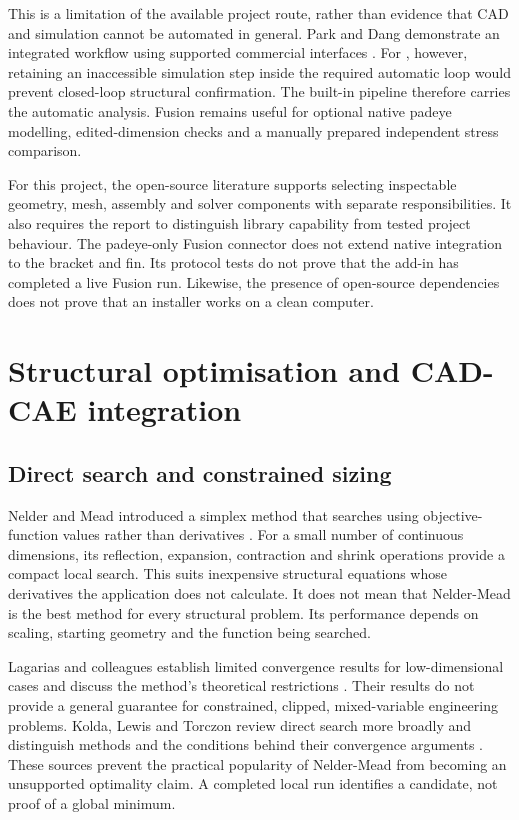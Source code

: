 This is a limitation of the available project route, rather than evidence that CAD and simulation cannot be automated in general. Park and Dang demonstrate an integrated workflow using supported commercial interfaces \cite{park2010}. For \NEMO{}, however, retaining an inaccessible simulation step inside the required automatic loop would prevent closed-loop structural confirmation. The built-in pipeline therefore carries the automatic analysis. Fusion remains useful for optional native padeye modelling, edited-dimension checks and a manually prepared independent stress comparison.

For this project, the open-source literature supports selecting inspectable geometry, mesh, assembly and solver components with separate responsibilities. It also requires the report to distinguish library capability from tested project behaviour. The padeye-only Fusion connector does not extend native integration to the bracket and fin. Its protocol tests do not prove that the add-in has completed a live Fusion run. Likewise, the presence of open-source dependencies does not prove that an installer works on a clean computer.

\section{Structural optimisation and CAD-CAE integration}
\label{sec:lit-optimisation}

\subsection{Direct search and constrained sizing}
\label{sec:lit-direct-search}

Nelder and Mead introduced a simplex method that searches using objective-function values rather than derivatives \cite{nelder1965}. For a small number of continuous dimensions, its reflection, expansion, contraction and shrink operations provide a compact local search. This suits inexpensive structural equations whose derivatives the application does not calculate. It does not mean that Nelder-Mead is the best method for every structural problem. Its performance depends on scaling, starting geometry and the function being searched.

Lagarias and colleagues establish limited convergence results for low-dimensional cases and discuss the method's theoretical restrictions \cite{lagarias1998}. Their results do not provide a general guarantee for constrained, clipped, mixed-variable engineering problems. Kolda, Lewis and Torczon review direct search more broadly and distinguish methods and the conditions behind their convergence arguments \cite{kolda2003}. These sources prevent the practical popularity of Nelder-Mead from becoming an unsupported optimality claim. A completed local run identifies a candidate, not proof of a global minimum.

